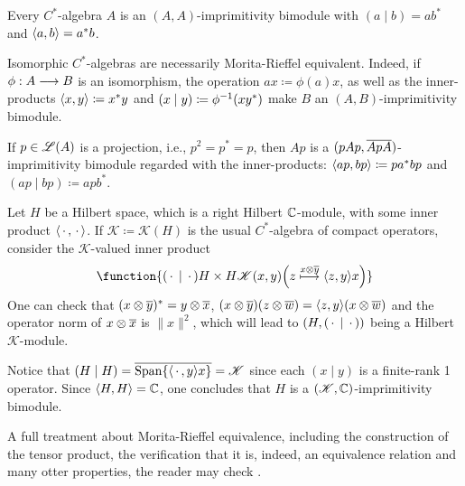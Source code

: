 \begin{exemplos}$\left.\right.$
	\begin{itroman}
		\item Every $C^*$-algebra $A$ is an $(A,A)$-imprimitivity bimodule with $(a\mid b) = ab^*$ and $\langle {a},{b}\rangle = a^*b$. 

		\item Isomorphic $C^*$-algebras are necessarily Morita-Rieffel equivalent. Indeed, if $\phi : A \longrightarrow B$ is an isomorphism, the operation $ax \coloneqq \phi(a) x$, as well as the inner-products $\langle {x},{y}\rangle \coloneqq x^*y$ and $(x\mid y)\coloneqq {\phi}^{-1}(xy^*)$ make $B$ an $(A,B)$-imprimitivity bimodule.

		\item If $p \in \mathscr L(A)$ is a projection, i.e., $p^2=p^* = p$, then $Ap$ is a $(pAp, \overline{ApA})$-imprimitivity bimodule regarded with the inner-products: $\langle {ap},{bp}\rangle \coloneqq pa^*bp$ and $(ap\mid bp) \coloneqq apb^*$.

		\item Let $H$ be a Hilbert space, which is a right Hilbert $\operatorname{\mathbb{C}}$-module, with some inner product $\langle {\operatorname{\,\cdot\,}},{\operatorname{\,\cdot\,}}\rangle$. If $\mathscr K \coloneqq \mathscr K(H)$ is the usual $C^*$-algebra of compact operators, consider the $\mathscr K$-valued inner product 
	\begin{equation*}
		\function{{(\come\mid \come)}{H\times H}{\mathscr K}{(x,y)}{\left(z \overset{x\otimes \con y}\longmapsto \inner{z}{y}x \right)}}
	\end{equation*}
	One can check that $(x\otimes \overline{y})^* = y \otimes \overline{x}$, $(x \otimes \overline{y})(z \otimes \overline{w}) = \langle {z},{y}\rangle(x\otimes \overline{w})$ and the operator norm of $x\otimes \overline{x}$ is $\|x\|^2$, which will lead to $\left(H, (\operatorname{\,\cdot\,}\mid \operatorname{\,\cdot\,})\right)$ being a Hilbert $\mathscr K$-module.

	Notice that $(H\mid H) = \overline{\operatorname{Span} \{\langle {\operatorname{\,\cdot\,}},{y}\rangle x\}} = \mathscr K$ since each $(x\mid y)$ is a finite-rank 1 operator. Since $\langle {H},{H}\rangle = \operatorname{\mathbb{C}}$, one concludes that $H$ is a $(\mathscr K, \operatorname{\mathbb{C}})$-imprimitivity bimodule.

	\end{itroman}
\end{exemplos}

A full treatment about Morita-Rieffel equivalence, including the construction of the tensor product, the verification that it is, indeed, an equivalence relation and many otter properties, the reader may check \cite{raeburn1998morita}.


